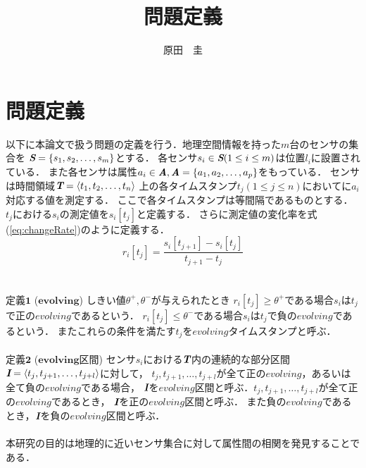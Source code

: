 \documentclass[11pt,j4a]{jarticle}
\title{問題定義}
\author{原田　圭}
\begin{document}
\maketitle
\section{問題定義}
以下に本論文で扱う問題の定義を行う．地理空間情報を持った$m$台のセンサの集合を
$\textit{\textbf{S}}=\{s_{1},s_{2},\ldots,s_{m}\}$とする．
各センサ$s_{i} \in \textit{\textbf{S}}(1 \leq i \leq m)$は位置$l_{i}$に設置されている．
また各センサは属性$a_{i} \in \textit{\textbf{A}},
\textit{\textbf{A}}=\{a_{1},a_{2},\ldots,a_{p}\}$をもっている．
センサは時間領域$\textit{\textbf{T}}=\langle t_{1},t_{2},\ldots,t_{n} \rangle$
上の各タイムスタンプ$t_{j}(1 \leq j \leq n)$においてに$a_{i}$対応する値を測定する．
ここで各タイムスタンプは等間隔であるものとする．
$t_{j}$における$s_{i}$の測定値を$s_{i}[t_{j}]$と定義する．
さらに測定値の変化率を式(\ref{eq:changeRate})のように定義する．
\begin{equation}
\label{eq:changeRate}
r_{i}[t_{j}]=\frac{s_{i}[t_{j+1}]-s_{i}[t_{j}]}{t_{j+1}-t_{j}}
\end{equation}
\\\\
$\textbf{定義1}$ \hspace{2pt} ($\textbf{evolving}$) \hspace{2pt}
しきい値$\theta^{+},\theta^{-}$が与えられたとき
$r_{i}[t_{j}] \geq \theta^{+}$である場合$s_{i}$は$t_{j}$で正の$evolving$であるという．
$r_{i}[t_{j}] \leq \theta^{-}$である場合$s_{i}$は$t_{j}$で負の$evolving$であるという．
またこれらの条件を満たす$t_{j}$を$evolving$タイムスタンプと呼ぶ．
\\\\
$\textbf{定義2}$ \hspace{2pt} ($\textbf{evolving区間}$) \hspace{2pt}
センサ$s_{i}$における$\textit{\textbf{T}}$内の連続的な部分区間
$\textit{\textbf{I}}=\langle t_{j},t_{j+1},\ldots,t_{j+l} \rangle$に対して，
$t_{j},t_{j+1},\ldots,t_{j+l}$が全て正の$evolving$，あるいは全て負の$evolving$である場合，
$\textit{\textbf{I}}$を$evolving$区間と呼ぶ．$t_{j},t_{j+1},\ldots,t_{j+l}$が全て正の$evolving$であるとき，
$\textit{\textbf{I}}$を正の$evolving$区間と呼ぶ．
また負の$evolving$であるとき，$\textit{\textbf{I}}$を負の$evolving$区間と呼ぶ．
\\\\
本研究の目的は地理的に近いセンサ集合に対して属性間の相関を発見することである．
\end{document}
